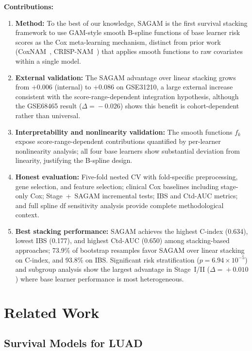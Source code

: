\documentclass[conference]{IEEEtran}
\begin{document}
\textbf{Contributions:}
\begin{enumerate}
  \item \textbf{Method:} To the best of our knowledge, SAGAM is the
    first survival stacking framework to use GAM-style smooth B-spline
    functions of base learner risk scores as the Cox meta-learning mechanism,
    distinct from prior work (CoxNAM~\cite{coxnam2023}, CRISP-NAM~\cite{crispnam2025})
    that applies smooth functions to raw covariates within a single model.
  \item \textbf{External validation:} The SAGAM advantage over
    linear stacking grows from $+0.006$ (internal) to $+0.086$ on GSE31210,
    a large external increase consistent with the score-range-dependent
    integration hypothesis, although the GSE68465 result ($\Delta\!=\!-0.026$)
    shows this benefit is cohort-dependent rather than universal.
  \item \textbf{Interpretability and nonlinearity validation:} The smooth
    functions $f_k$ expose score-range-dependent contributions quantified
    by per-learner nonlinearity analysis; all four base learners show
    substantial deviation from linearity, justifying the B-spline design.
  \item \textbf{Honest evaluation:} Five-fold nested CV with fold-specific
    preprocessing, gene selection, and feature selection; clinical Cox
    baselines including stage-only Cox; Stage~+~SAGAM incremental tests;
    IBS and Ctd-AUC metrics; and full spline df sensitivity analysis
    provide complete methodological context.
  \item \textbf{Best stacking performance:} SAGAM achieves the highest
    C-index (0.634), lowest IBS (0.177), and highest Ctd-AUC (0.650) among
    stacking-based approaches; 73.9\% of bootstrap resamples favor SAGAM
    over linear stacking on C-index, and 93.8\% on IBS.
    Significant risk stratification ($p = 6.94 \times 10^{-5}$) and
    subgroup analysis show the largest advantage in Stage~I/II
    ($\Delta\!=\!+0.010$) where base learner performance is most heterogeneous.
\end{enumerate}

\section{Related Work}

\subsection{Survival Models for LUAD}
\end{document}
